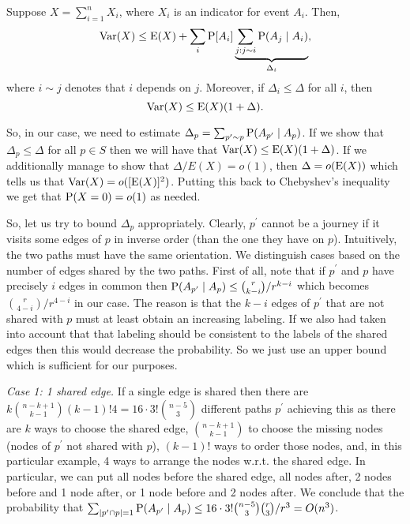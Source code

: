 \documentclass[oribibl, 11pt]{llncs}
\renewcommand{\P}{\textup{P}}
\newcommand{\E}{\textup{E}}
\newcommand{\Var}{\textup{Var}}
\begin{document}
\begin{theorem} \label{the:secmom}
Suppose $X=\sum_{i=1}^n X_i$, where $X_i$ is an indicator for event $A_i$. Then,
\begin{equation*}
\Var(X)\leq \E(X)+\sum_i \P[A_i]\underbrace{\sum_{j:j\sim i}\P(A_j\mid A_i)}_{\Delta_i},
\end{equation*}
where $i\sim j$ denotes that $i$ depends on $j$. Moreover, if $\Delta_i\leq \Delta$ for all $i$, then
\begin{equation*}
\Var(X)\leq \E(X)(1+\Delta).
\end{equation*}
\end{theorem}

So, in our case, we need to estimate $\Delta_p=\sum_{p^\prime\sim p} \P(A_{p^\prime}\mid A_p)$. If we show that $\Delta_p\leq \Delta$ for all $p\in S$ then we will have that $\Var(X)\leq \E(X)(1+\Delta)$. If we additionally manage to show that $\Delta/E(X)=o(1)$, then $\Delta=o(\E(X))$ which tells us that $\Var(X)=o([\E(X)]^2)$. Putting this back to Chebyshev's inequality we get that $\P(X=0)=o(1)$ as needed. 

So, let us try to bound $\Delta_p$ appropriately. Clearly, $p^\prime$ cannot be a journey if it visits some edges of $p$ in inverse order (than the one they have on $p$). Intuitively, the two paths must have the same orientation. We distinguish cases based on the number of edges shared by the two paths. First of all, note that if $p^\prime$ and $p$ have precisely $i$ edges in common then $\P(A_{p^\prime}\mid A_p)\leq\binom{r}{k-i}/r^{k-i}$ which becomes $\binom{r}{4-i}/r^{4-i}$ in our case. The reason is that the $k-i$ edges of $p^\prime$ that are not shared with $p$ must at least obtain an increasing labeling. If we also had taken into account that that labeling should be consistent to the labels of the shared edges then this would decrease the probability. So we just use an upper bound which is sufficient for our purposes. 

\emph{Case 1: 1 shared edge.} If a single edge is shared then there are $k\binom{n-k+1}{k-1}(k-1)!4=16\cdot 3!\binom{n-5}{3}$ different paths $p^\prime$ achieving this as there are $k$ ways to choose the shared edge, $\binom{n-k+1}{k-1}$ to choose the missing nodes (nodes of $p^\prime$ not shared with $p$), $(k-1)!$ ways to order those nodes, and, in this particular example, 4 ways to arrange the nodes w.r.t. the shared edge. In particular, we can put all nodes before the shared edge, all nodes after, 2 nodes before and 1 node after, or 1 node before and 2 nodes after. We conclude that the probability that $\sum_{|p^\prime\cap p|=1} \P(A_{p^\prime}\mid A_p)\leq 16\cdot 3!\binom{n-5}{3}\binom{r}{3}/r^{3}=O(n^{3})$.
\end{document}
